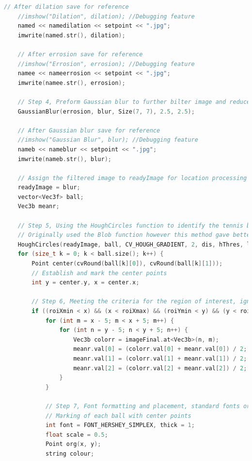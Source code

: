 \documentclass[a4paper, 10pt]{article}
\begin{document}
\begin{lstlisting}[language = C++]
	// After dilation save for reference
	//imshow("Dilation", dilation); //Debugging feature
	named << namedilation << setpoint << ".jpg";
	imwrite(named.str(), dilation);

	// After errosion save for reference
	//imshow("Errosion", errosion); //Debugging feature
	namee << nameerrosion << setpoint << ".jpg";
	imwrite(namee.str(), errosion);

	// Step 4, Preform Gaussian blur to further bilter image and reduce noise to better detect the raound point for the circles
	GaussianBlur(errosion, blur, Size(7, 7), 2.5, 2.5);

	// After Gaussian blur save for reference
	//imshow("Gaussian Blur", blur); //Debugging feature
	nameb << nameblur << setpoint << ".jpg";
	imwrite(nameb.str(), blur);

	// Assign the filtered image to readyImage for location processing
	readyImage = blur;
	vector<Vec3f> ball;
	Vec3b meanr;

	// Step 5, Using the HoughCircles function to identify the tennis ball radius
	// Originally used the Blob function however this method gave better results
	HoughCircles(readyImage, ball, CV_HOUGH_GRADIENT, 2, dis, hThres, lThres, minRad, maxRad);
	for (size_t k = 0; k < ball.size(); k++) {
		Point center(cvRound(ball[k][0]), cvRound(ball[k][1]));
		// Establish and mark the center points
		int y = center.y, x = center.x;

		// Step 6, Meeting the criteria for the region of interest, ignore rest
		if ((roiXmin < x) && (x < roiXmax) && (roiYmin < y) && (y < roiYmax)) {
			for (int m = x - 5; m < x + 5; m++) {
				for (int n = y - 5; n < y + 5; n++) {
					Vec3b colorr = imageFinal.at<Vec3b>(n, m);
					meanr.val[0] = (colorr.val[0] + meanr.val[0]) / 2;
					meanr.val[1] = (colorr.val[1] + meanr.val[1]) / 2;
					meanr.val[2] = (colorr.val[2] + meanr.val[2]) / 2;
				}
			}

			// Step 7, Font formatting and placement, standard fonts origionating from center point of each ball
			// Marking of each ball with center points
			int font = FONT_HERSHEY_SIMPLEX, thick = 1;
			float scale = 0.5;
			Point org(x, y);
			string colour;


\end{lstlisting}
\end{document}

